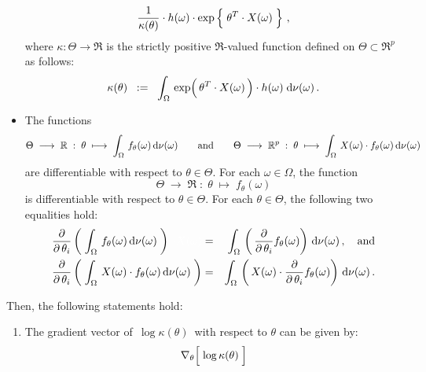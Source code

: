 \begin{theorem}
\begin{itemize}
\begin{equation*}
		\dfrac{1}{\kappa(\theta)}
		\cdot
		h(\omega)
		\cdot
		\exp\left\{\; \theta^{T} \!\overset{{\color{white}-}}{\cdot}\! X(\omega) \;\right\}\,,
	\end{equation*}
	where $\kappa : \Theta \longrightarrow \Re$ is the strictly positive
	$\Re$-valued function defined on $\Theta \subset \Re^{p}$ as follows:
	\begin{equation*}
	\kappa(\theta)
	\;\; := \;\;
		\int_{\Omega}\,
			\exp\!\left(\,\theta^{T} \!\overset{{\color{white}-}}{\cdot}\! X(\omega)\,\right) \cdot h(\omega)
		\;\d\nu(\omega)\,.
	\end{equation*}
\item
	The functions
	\begin{equation*}
	\Theta \; \longrightarrow \; \mathbb{R}
	\; : \; \theta \; \longmapsto \; \int_{\Omega}\,f_{\theta}(\omega)\,\textnormal{d}\nu(\omega)
	\quad\quad\textnormal{and}\quad\quad
	\Theta \; \longrightarrow \; \mathbb{R}^{p}
	\; : \; \theta \; \longmapsto \; \int_{\Omega}\,X(\omega) \cdot f_{\theta}(\omega)\,\textnormal{d}\nu(\omega)
	\end{equation*}
	are differentiable with respect to $\theta \in \Theta$.
	For each $\omega \in \Omega$, the function
	\begin{equation*}
	\Theta \; \longrightarrow \; \Re
	\; : \; \theta \; \longmapsto \; f_{\theta}(\omega)
	\end{equation*}
	is differentiable with respect to $\theta \in \Theta$.
	For each $\theta \in \Theta$, the following two equalities hold:
	\begin{eqnarray*}
	\dfrac{\partial}{\partial\,\theta_{i}} \left(\; \int_{\Omega}\,f_{\theta}(\omega)\,\d\nu(\omega) \;\right)
	{\color{white}\;\cdot X(\omega)}
	&=&
	\int_{\Omega}\, \left(\,\dfrac{\partial}{\partial\,\theta_{i}} f_{\theta}(\omega)\right) \,\d\nu(\omega)\,,
	\quad\textnormal{and}
	\\
	\dfrac{\partial}{\partial\,\theta_{i}} \left(\; \int_{\Omega}\,X(\omega) \cdot f_{\theta}(\omega)\,\d\nu(\omega) \;\right)
	&=&
	\int_{\Omega}\, \left(\,X(\omega) \cdot \dfrac{\partial}{\partial\,\theta_{i}} f_{\theta}(\omega)\right) \,\d\nu(\omega)\,.
	\end{eqnarray*}
\end{itemize}
Then, the following statements hold:
\begin{enumerate}
\item\label{gradientLogKappa}
	The gradient vector of \,$\log\kappa(\theta)$\, with respect to $\theta$ can be given by:
	\begin{equation*}
	\nabla_{\theta}\!\left[\;\overset{{\color{white}.}}{\log}\,\kappa(\theta)\;\right]

\end{equation*}
\end{enumerate}
\end{theorem}
